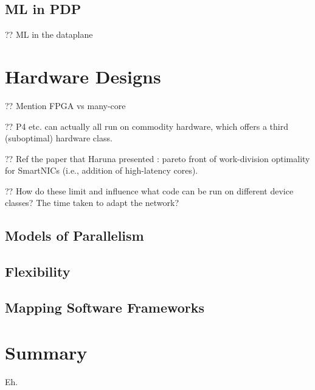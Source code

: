 \subsection{ML in PDP}
?? ML in the dataplane~\parencite{DBLP:conf/hotnets/XiongZ19,DBLP:conf/sigcomm/SanvitoSB18,DBLP:journals/corr/abs-1801-05731,DBLP:journals/corr/abs-2009-02353,langlet-ml-netronome,DBLP:journals/corr/abs-2002-08987}

\section{Hardware Designs}

?? Mention FPGA vs many-core

?? P4 etc. can actually all run on commodity hardware, which offers a third (suboptimal) hardware class.

?? Ref the paper that Haruna presented \parencite{DBLP:conf/icc/MafiolettikDMRV20}: pareto front of work-division optimality for SmartNICs (i.e., addition of high-latency cores).

?? How do these limit and influence what code can be run on different device classes? The time taken to adapt the network?

\subsection{Models of Parallelism}

\subsection{Flexibility}

\subsection{Mapping Software Frameworks}

\section{Summary}
Eh.
